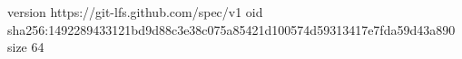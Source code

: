 version https://git-lfs.github.com/spec/v1
oid sha256:1492289433121bd9d88c3e38c075a85421d100574d59313417e7fda59d43a890
size 64
